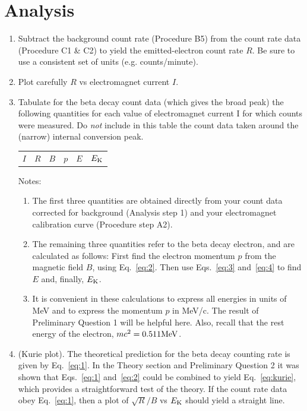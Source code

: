 \documentclass{article}
\begin{document}
\section{Analysis}

\begin{enumerate}

\item Subtract the background count rate (Procedure B5) from the count
rate data (Procedure C1 \& C2) to yield the emitted-electron count rate
$R$.  Be sure to use a consistent set of units (e.g. counts/minute).

\item Plot carefully $R$ vs electromagnet current $I$.

\item Tabulate for the beta decay count data (which gives the
broad peak) the following quantities for each value of electromagnet
current I for which counts were measured.  Do {\em not}
include in this table the count data taken around the (narrow) internal
conversion peak.

\begin{tabular}{c c c c c c}
$I$ & $R$ & $B$ & $p$ & $E$ & $E_{\rm K}$\\
\end{tabular}

Notes:
\begin{enumerate}
\item The first three quantities are obtained directly from your count
data corrected for background (Analysis step 1) and your electromagnet
calibration curve (Procedure step A2).

\item The remaining three quantities refer to the beta decay electron,
and are calculated as follows:  First find the electron momentum $p$ from the magnetic field $B$,
using Eq.~\ref{eq:2}.  Then use Eqs.~\ref{eq:3} and~\ref{eq:4} to find $E$ and, finally,
$E_{\rm K}$.

\item It is convenient in these calculations to express all
energies in units of MeV and to express the momentum $p$ in MeV/c.  The
result of Preliminary Question 1 will be helpful here.  Also, recall
that the rest energy of the electron, $mc^2 = 0.511 {\rm MeV}$.
\end{enumerate}

\item (Kurie plot).  The theoretical prediction for the beta
decay counting rate is given by Eq.~\ref{eq:1}.  In the Theory section and
Preliminary Question 2 it was shown that Eqs.~\ref{eq:1} and~\ref{eq:2} could be
combined  to yield Eq.~\ref{eq:kurie}, which provides a straightforward test of
the theory.  If the count rate data obey Eq.~\ref{eq:1}, then a plot of
$\sqrt{R}/B$ vs $E_{\rm K}$ should yield a straight line.


\end{enumerate}
\end{document}
